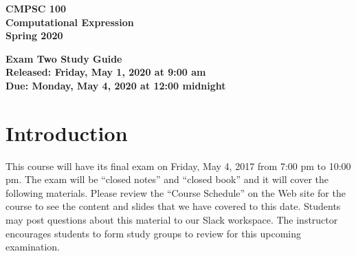 \documentclass[11pt]{article}
\newcommand{\assignmentduedate}{May 4}
\newcommand{\assignmentassignedate}{May 1}
\newcommand{\assignmentnumber}{Two}
\newcommand{\labyear}{2020}
\newcommand{\assignedday}{Friday}
\newcommand{\dueday}{Monday}
\newcommand{\releasedtime}{9:00 am}
\newcommand{\duetime}{12:00 midnight}
\newcommand{\assigneddate}{Released: \assignedday, \assignmentassignedate, \labyear{} at \releasedtime{}}
\newcommand{\duedate}{Due: \dueday, \assignmentduedate, \labyear{} at \duetime{}}
\newcommand{\guidetitle}[1]
{
  \begin{center}
    \begin{center}
      \bf
      CMPSC 100\\Computational Expression\\
      Spring 2020\\
      \medskip
    \end{center}
    \bf
    #1
  \end{center}
}
\begin{document}
\guidetitle{Exam \assignmentnumber{} Study Guide \\ \assigneddate{} \\ \duedate{}}

\section*{Introduction}

This course will have its final exam on Friday, \assignmentduedate{}, 2017 from
7:00 pm to 10:00 pm. The exam will be ``closed notes'' and ``closed book'' and
it will cover the following materials. Please review the ``Course Schedule'' on
the Web site for the course to see the content and slides that we have covered
to this date. Students may post questions about this material to our Slack
workspace. The instructor encourages students to form study groups to review for
this upcoming examination.
\end{document}

